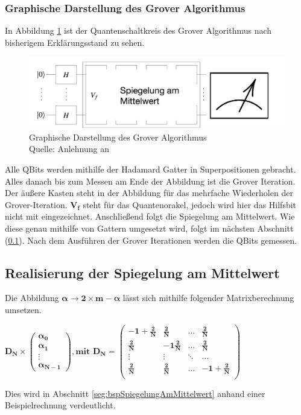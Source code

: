 \subsubsection{Graphische Darstellung des Grover Algorithmus}
In Abbildung \ref{fig:algoInformell} ist der Quantenschaltkreis des Grover Algorithmus nach bisherigem Erklärungsstand zu sehen.
\begin{figure}[hbtp]
	\centering
	\includegraphics[width=1\textwidth]{figures/algoInformell.png}
	\caption{Graphische Darstellung des Grover Algorithmus \\ Quelle: Anlehnung an \cite[S. 146]{Ho17}}
	\label{fig:algoInformell}
\end{figure}
Alle QBits werden mithilfe der Hadamard Gatter in Superpositionen gebracht. Alles danach bis zum Messen am Ende der Abbildung ist die Grover Iteration.
Der äußere Kasten steht in der Abbildung für das mehrfache Wiederholen der Grover-Iteration. $\mathbf{V_f}$ steht für das Quantenorakel, jedoch wird hier das Hilfsbit nicht mit eingezeichnet. Anschließend folgt die Spiegelung am Mittelwert. Wie diese genau mithilfe von Gattern umgesetzt wird, folgt im nächsten Abschnitt (\ref{sec:realiserung}). Nach dem Ausführen der Grover Iterationen werden die QBits gemessen.
\subsection{Realisierung der Spiegelung am Mittelwert}
\label{sec:realiserung}
Die Abbildung $\mathbf{\alpha \rightarrow 2 \times m - \alpha}$ lässt sich mithilfe folgender Matrixberechnung umsetzen.
\begin{center}
	$\mathbf{D_N \times 
		\begin{pmatrix}
			\alpha_0 \\ \alpha_1 \\ \vdots \\  \alpha_{N-1}
		\end{pmatrix}, \text{mit } D_N = 
		\begin{pmatrix}
			-1 + \frac{2}{N} & \frac{2}{N} & \dots& \frac{2}{N} \\
			\frac{2}{N} & -1 \frac{2}{N} & \dots& \frac{2}{N} \\
			\vdots & \vdots & \ddots& \dots \\
			\frac{2}{N} & \frac{2}{N} & \dots& -1+ \frac{2}{N} \\
	\end{pmatrix}}$
\end{center}
Dies wird in Abschnitt \ref{seg:bspSpiegelungAmMittelwert} anhand einer Beispielrechnung verdeutlicht.
